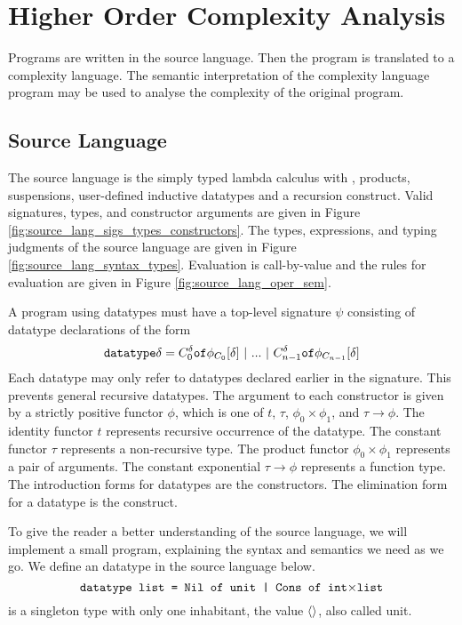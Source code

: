 \chapter{Higher Order Complexity Analysis}

Programs are written in the source language. Then the program is translated
to a complexity language. The semantic interpretation of the complexity
language program may be used to analyse the complexity of the original
program.

\section{Source Language}
The source language is the simply typed lambda calculus with ,
products, suspensions, user-defined inductive datatypes and a recursion
construct. Valid signatures, types, and constructor arguments are given in
Figure \ref{fig:source_lang_sigs_types_constructors}. The types, expressions,
and typing judgments of the source language are given in Figure
\ref{fig:source_lang_syntax_types}. Evaluation is call-by-value and the rules
for evaluation are given in Figure \ref{fig:source_lang_oper_sem}.


A program using datatypes must have a top-level signature $\psi$ consisting of
datatype declarations of the form
%
\[ \texttt{datatype} \delta = C^\delta_0 \texttt{of} \phi_{C_0}[\delta] \ |\ ...\ |\ C^\delta_{n-1} \texttt{of} \phi_{C_{n-1}}[\delta] \]
%
Each datatype may only refer to datatypes declared earlier in the signature.
This prevents general recursive datatypes.  The argument to each constructor is
given by a strictly positive functor $\phi$, which is one of $t$, $\tau$,
$\phi_0 \times \phi_1$, and $\tau \rightarrow \phi$.  The identity functor $t$
represents recursive occurrence of the datatype.  The constant functor $\tau$
represents a non-recursive type.  The product functor $\phi_0 \times \phi_1$
represents a pair of arguments.  The constant exponential $\tau \rightarrow \phi$
represents a function type.  The introduction forms for datatypes are the
constructors.  The elimination form for a datatype is the  construct.

To give the reader a better understanding of the source language, we will
implement a small program, explaining the syntax and semantics we need as we
go.  We define an  datatype in the source language below.
%
\[
  \texttt{datatype list = Nil of unit | Cons of int$\times$list}
\]
%
 is a singleton type with only one inhabitant, the value
$\langle\rangle$, also called unit.


